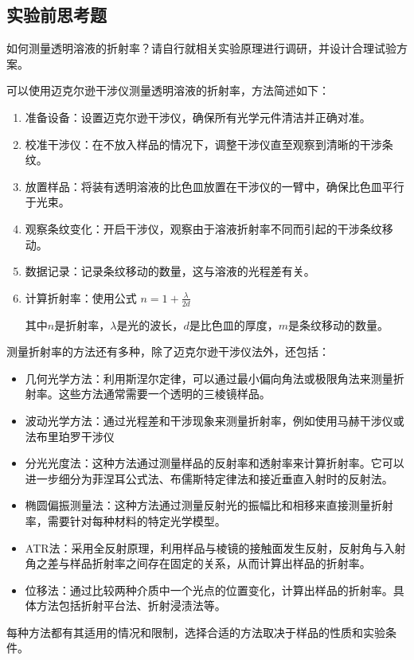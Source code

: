 \documentclass[dvipsnames, svgnames,a4paper,11pt]{article}
\begin{document}
	




\subsection{实验前思考题}

	\begin{question}
		如何测量透明溶液的折射率？请自行就相关实验原理进行调研，并设计合理试验方案。
	\end{question}
		可以使用迈克尔逊干涉仪测量透明溶液的折射率，方法简述如下：
		
		\begin{enumerate}
			\item 准备设备：设置迈克尔逊干涉仪，确保所有光学元件清洁并正确对准。
			\item 校准干涉仪：在不放入样品的情况下，调整干涉仪直至观察到清晰的干涉条纹。
			\item 放置样品：将装有透明溶液的比色皿放置在干涉仪的一臂中，确保比色皿平行于光束。
			\item 观察条纹变化：开启干涉仪，观察由于溶液折射率不同而引起的干涉条纹移动。
			\item 数据记录：记录条纹移动的数量，这与溶液的光程差有关。
			\item 计算折射率：使用公式 $n=1+\frac{\lambda}{2d}$
			
			   其中$n$是折射率，$\lambda$是光的波长，$ d$是比色皿的厚度，$m$是条纹移动的数量。
		\end{enumerate}
		
		测量折射率的方法还有多种，除了迈克尔逊干涉仪法外，还包括：
		
		\begin{itemize}
			\item 几何光学方法：利用斯涅尔定律，可以通过最小偏向角法或极限角法来测量折射率。这些方法通常需要一个透明的三棱镜样品。
			\item 波动光学方法：通过光程差和干涉现象来测量折射率，例如使用马赫干涉仪或法布里珀罗干涉仪
			\item 分光光度法：这种方法通过测量样品的反射率和透射率来计算折射率。它可以进一步细分为菲涅耳公式法、布儒斯特定律法和接近垂直入射时的反射法。
			\item 椭圆偏振测量法：这种方法通过测量反射光的振幅比和相移来直接测量折射率，需要针对每种材料的特定光学模型。
			\item ATR法：采用全反射原理，利用样品与棱镜的接触面发生反射，反射角与入射角之差与样品折射率之间存在固定的关系，从而计算出样品的折射率。
			\item 位移法：通过比较两种介质中一个光点的位置变化，计算出样品的折射率。具体方法包括折射平台法、折射浸渍法等。
		\end{itemize}
		每种方法都有其适用的情况和限制，选择合适的方法取决于样品的性质和实验条件。
		
\end{document}
